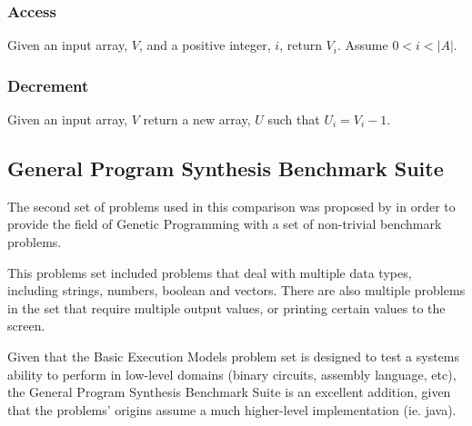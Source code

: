 \subsubsection{Access}

Given an input array, $V$, and a positive integer, $i$, return $V_i$. Assume $0 < i < |A|$.

\subsubsection{Decrement}

Given an input array, $V$ return a new array, $U$ such that $U_i = V_i - 1$.


\subsection{General Program Synthesis Benchmark Suite}
The second set of problems used in this comparison was proposed by \cite{Helmuth2015b} in order to provide the field of Genetic Programming with a set of non-trivial benchmark problems.

This problems set included problems that deal with multiple data types, including strings, numbers, boolean and vectors. There are also multiple problems in the set that require multiple output values, or printing certain values to the screen.

Given that the Basic Execution Models problem set is designed to test a systems ability to perform in low-level domains (binary circuits, assembly language, etc), the General Program Synthesis Benchmark Suite is an excellent addition, given that the problems' origins assume a much higher-level implementation (ie. java).

